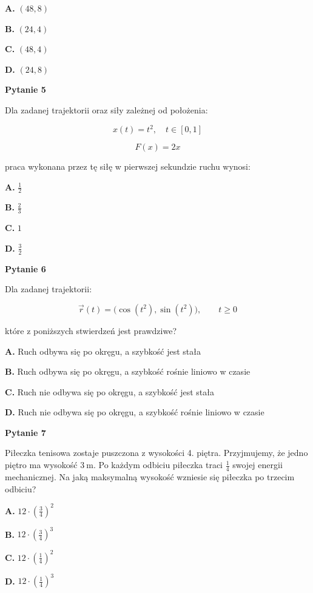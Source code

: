 \documentclass[11pt,a4paper]{article}
\begin{document}
{\large
\textbf{A.} $(48, 8)$

\textbf{B.} $(24, 4)$

\textbf{C.} $(48, 4)$

\textbf{D.} $(24, 8)$
}

\newpage

{\LARGE\textbf{Pytanie 5}}

Dla zadanej trajektorii oraz siły zależnej od położenia:

\[
x(t) = t^2, \quad t \in [0,1]
\]

\[
F(x) = 2x
\]

praca wykonana przez tę siłę w pierwszej sekundzie ruchu wynosi:

\vspace{0.5em}

{\large
\textbf{A.} $\frac{1}{2}$

\textbf{B.} $\frac{2}{3}$

\textbf{C.} $1$

\textbf{D.} $\frac{3}{2}$
}

\newpage

{\LARGE\textbf{Pytanie 6}}

Dla zadanej trajektorii:

\[
\vec r(t) = \bigl(\cos(t^2), \sin(t^2)\bigr), \qquad t \ge 0
\]

które z poniższych stwierdzeń jest prawdziwe?

\vspace{0.5em}

{\large
\textbf{A.} Ruch odbywa się po okręgu, a szybkość jest stała

\textbf{B.} Ruch odbywa się po okręgu, a szybkość rośnie liniowo w czasie

\textbf{C.} Ruch nie odbywa się po okręgu, a szybkość jest stała

\textbf{D.} Ruch nie odbywa się po okręgu, a szybkość rośnie liniowo w czasie
}

\newpage

{\LARGE\textbf{Pytanie 7}}

Piłeczka tenisowa zostaje puszczona z wysokości 4. piętra. Przyjmujemy, że jedno piętro ma wysokość $3\ \text{m}$. Po każdym odbiciu piłeczka traci $\frac{1}{4}$ swojej energii mechanicznej. Na jaką maksymalną wysokość wzniesie się piłeczka po trzecim odbiciu?

\vspace{0.5em}

{\large
\textbf{A.} $12\cdot\left(\frac{3}{4}\right)^2$

\textbf{B.} $12\cdot\left(\frac{3}{4}\right)^3$

\textbf{C.} $12\cdot\left(\frac{1}{4}\right)^2$

\textbf{D.} $12\cdot\left(\frac{1}{4}\right)^3$
}
\end{document}

